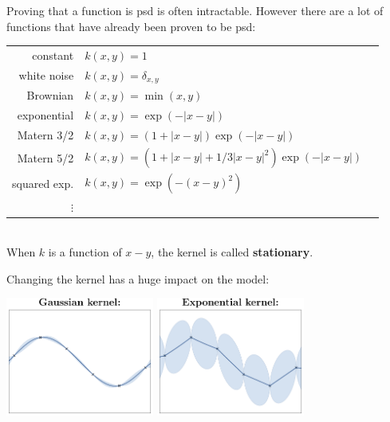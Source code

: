 \documentclass{beamer}
\begin{document}
\begin{frame}{}
Proving that a function is psd is often intractable. However there are a lot of functions that have already been proven to be psd:\\
\vspace{2mm}
\footnotesize
\begin{tabular}{rlN}
		constant & $ \displaystyle k(x,y) = 1 $ &\\[4mm]
		white noise & $ \displaystyle k(x,y) = \delta_{x,y} $ &\\[4mm]
		Brownian & $ \displaystyle k(x,y) =  \min (x,y) $ &\\[4mm]
		exponential & $\displaystyle k(x,y) = \exp \left(- |x-y| \right)$ &\\[4mm]
		Matern 3/2 & $\displaystyle k(x,y) = \left(1 + |x-y| \right) \exp \left(- |x-y| \right)$ &\\[4mm]
		Matern 5/2 & $\displaystyle k(x,y) = \left(1 + |x-y| + 1/3|x-y|^2 \right) \exp \left(- |x-y| \right)$ &\\[4mm]
		squared exp. & $\displaystyle k(x,y) = \exp \left(- (x-y)^2 \right)$ &\\[4mm]
		$\vdots$ & 
\end{tabular}\\
\vspace{2mm}
\normalsize
When $k$ is a function of $x-y$, the kernel is called \textbf{stationary}.
\end{frame}

\begin{frame}{}
Changing the kernel \alert{has a huge impact on the model}:\\ 
\begin{center}
\includegraphics[height=3.9cm]{figures/R/Fig2-GP-rbf} \qquad 
\includegraphics[height=3.9cm]{figures/R/Fig2-GP-exp}
\end{center}
\end{frame}
\end{document}
